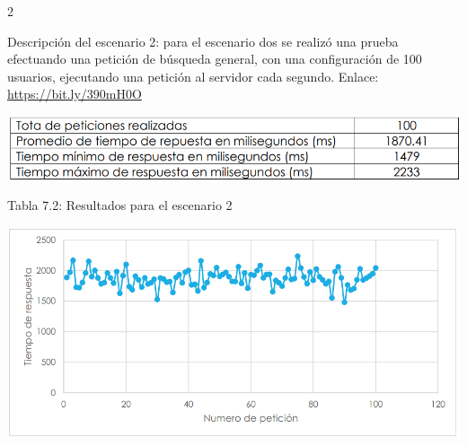 \documentclass[12pt,spanish,Letterpaper,openany]{book}
\begin{document}
\begin {multicols}{2}
\begin {flushleft}
\begin{minipage}[c]{\columnwidth}
\end{minipage}

\end {flushleft}

Descripción del escenario 2: para el escenario dos se realizó una prueba efectuando una petición de búsqueda general, con una configuración de 100 usuarios, ejecutando una petición al servidor cada segundo.
Enlace: \url{https://bit.ly/390mH0O}

\begin {center}

\noindent\begin{minipage}[c]{\columnwidth}
\centering

\begin{center}\includegraphics[width=1\linewidth]{images/05_06} \end{center}
\vspace{0.01cm}
\footnotesize
\centering

Tabla 7.2: Resultados para el escenario 2

\end{minipage}

\end {center}

\begin {flushleft}
\noindent\begin{minipage}[c]{\columnwidth}

\includegraphics[width=1\linewidth]{images/05_07}

\end{minipage}

\end {flushleft}


\end{multicols}
\end{document}
